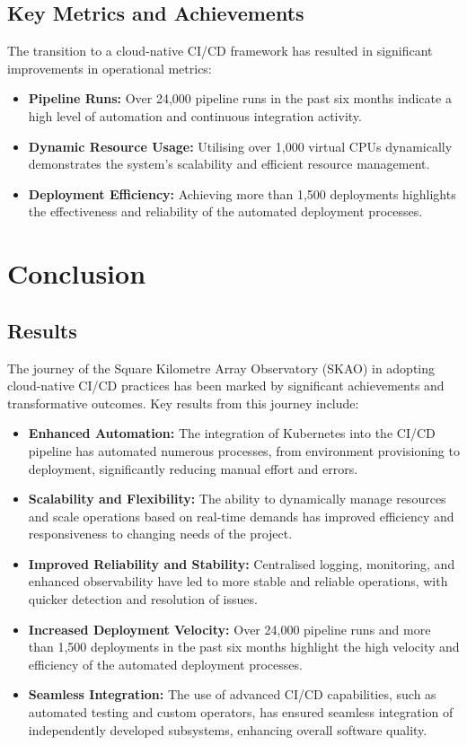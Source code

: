 \documentclass[a4paper]{spie}  %
\begin{document}
\subsection{Key Metrics and Achievements}

The transition to a cloud-native CI/CD framework has resulted in significant improvements in operational metrics:

\begin{itemize}
    \item \textbf{Pipeline Runs:} Over 24,000 pipeline runs in the past six months indicate a high level of automation and continuous integration activity.
    \item \textbf{Dynamic Resource Usage:} Utilising over 1,000 virtual CPUs dynamically demonstrates the system's scalability and efficient resource management.
    \item \textbf{Deployment Efficiency:} Achieving more than 1,500 deployments highlights the effectiveness and reliability of the automated deployment processes.
\end{itemize}

\section{Conclusion}

 \subsection{Results}
 
The journey of the Square Kilometre Array Observatory (SKAO) in adopting cloud-native CI/CD practices has been marked by significant achievements and transformative outcomes. Key results from this journey include:

\begin{itemize}
    \item \textbf{Enhanced Automation:} The integration of Kubernetes into the CI/CD pipeline has automated numerous processes, from environment provisioning to deployment, significantly reducing manual effort and errors.
    \item \textbf{Scalability and Flexibility:} The ability to dynamically manage resources and scale operations based on real-time demands has improved efficiency and responsiveness to changing needs of the project.
    \item \textbf{Improved Reliability and Stability:} Centralised logging, monitoring, and enhanced observability have led to more stable and reliable operations, with quicker detection and resolution of issues.
    \item \textbf{Increased Deployment Velocity:} Over 24,000 pipeline runs and more than 1,500 deployments in the past six months highlight the high velocity and efficiency of the automated deployment processes.
    \item \textbf{Seamless Integration:} The use of advanced CI/CD capabilities, such as automated testing and custom operators, has ensured seamless integration of independently developed subsystems, enhancing overall software quality.
\end{itemize}
\end{document}

